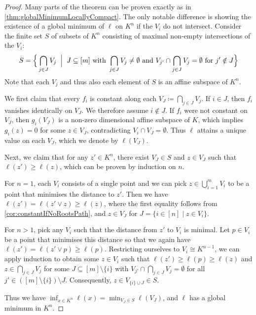 \documentclass[10pt]{article}
\theoremstyle{definition}
\newcommand{\suchthat}{\;\ifnum\currentgrouptype=16 \middle\fi|\;}
\newcommand{\bigmid}{\left.\vphantom{\Big\{} \suchthat \vphantom{\Big\}}\right.}
\begin{document}
\begin{proof}
  Many parts of the theorem can be proven exactly as in \cref{thm:globalMinimumLocallyCompact}.  The only notable difference is showing the existence of a global minimum of $\ell$ on $K^n$ if the $V_i$ do not intersect.
  Consider the finite set $S$ of subsets of $K^n$ consisting of maximal non-empty intersections of the $V_i$:
  \begin{equation*}
    S = \Big\{ \bigcap_{j\in J} V_{j} \bigmid J\subseteq [m]\text{ with } \bigcap_{j\in J} V_{j}\neq\emptyset \text{ and } V_{j'}\cap \bigcap_{j\in J} V_{j}=\emptyset \text{ for }j'\notin J\Big\}
  \end{equation*}
  Note that each $V_j$ and thus also each element of $S$ is an affine subspace of $K^n$.

  We first claim that every $f_i$ is constant along each $V_J\coloneqq \bigcap_{j\in J} V_{j}$.  If \(i \in J\), then \(f_i\) vanishes identically on \(V_J\). We therefore assume \(i \notin J\). If $f_i$ were not constant on $V_J$, then $g_i(V_J)$ is a non-zero dimensional affine subspace of $K$, which implies $g_i(z) = 0$ for some $z\in V_J$, contradicting $V_i\cap V_J=\emptyset$.  Thus $\ell$ attains a unique value on each $V_J$, which we denote by $\ell(V_J)$.

  Next, we claim that for any $z' \in K^n$, there exist $V_J \in S$ and $z \in V_J$ such that $\ell(z')\geq\ell(z)$, which can be proven by induction on $n$.

  For $n=1$, each $V_i$ consists of a single point and we can pick $z\in\bigcup_{i=1}^mV_i$ to be a point that minimises the distance to $z'$.  Then we have $\ell(z') = \ell(z' \vee z) \ge \ell(z)$, where the first equality follows from \cref{cor:constantIfNoRootsPath}, and $z\in V_J$ for $J=\{i\in [n]\mid z\in V_i\}$.

  For $n>1$, pick any $V_i$ such that the distance from $z'$ to $V_i$ is minimal. Let $p \in V_i$ be a point that minimises this distance so that we again have $\ell(z') = \ell(z' \vee p) \ge \ell(p)$.  Restricting ourselves to $V_i\cong K^{n-1}$, we can apply induction to obtain some $z\in V_i$ such that $\ell(z')\geq\ell(p)\geq\ell(z)$ and $z\in \bigcap_{j\in J} V_j$ for some $J\subseteq [m]\setminus \{i\}$ with $V_{j'}\cap \bigcap_{j\in J} V_j=\emptyset$ for all $j'\in ([m]\setminus \{i\})\setminus J$.  Consequently, $z\in V_{\{i\}\cup J}\in S$.

 Thus we have $\inf_{x \in K^n} \ell(x) = \min_{V_J\in S} \ell(V_J)$, and $\ell$ has a global minimum in $K^n$.
\end{proof}
\end{document}
